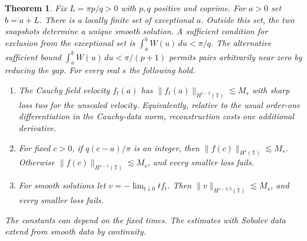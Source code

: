 \documentclass[11pt]{article}
\newtheorem{theorem}{Theorem}
\newcommand{\T}{\mathbb T}
\newcommand{\HS}[1]{H^{#1}(\T)}
\begin{document}
\begin{theorem}
\label{thm}
Fix $L=\pi p/q>0$ with $p,q$ positive and coprime. For $a>0$ set
$b=a+L$. There is a locally finite set of exceptional $a$.
Outside this set, the two snapshots determine a unique smooth solution.
A sufficient condition for exclusion from the exceptional set is
$\int_a^b W(u)\,du<\pi/q$. The alternative sufficient bound $\int_a^b W(u)\,du<\pi/(p+1)$ permits pairs arbitrarily near zero by reducing the gap.
For every real $s$ the following hold.
\begin{enumerate}
\item The Cauchy field velocity $f_t(a)$ has
$\|f_t(a)\|_{\HS{s-2}}\lesssim M_s$ with sharp loss two for the unscaled
velocity. Equivalently, relative to the usual order-one differentiation
in the Cauchy-data norm, reconstruction costs one additional derivative.
\item For fixed $c>0$, if $q(c-a)/\pi$ is an integer, then
$\|f(c)\|_{\HS{s}}\lesssim M_s$. Otherwise
$\|f(c)\|_{\HS{s-1}}\lesssim M_s$, and every smaller loss fails.
\item For smooth solutions let $v=-\lim_{t\downarrow0}t f_t$.
Then $\|v\|_{\HS{s-3/2}}\lesssim M_s$, and every smaller loss fails.
\end{enumerate}
The constants can depend on the fixed times. The estimates with
Sobolev data extend from smooth data by continuity.
\end{theorem}
\end{document}
